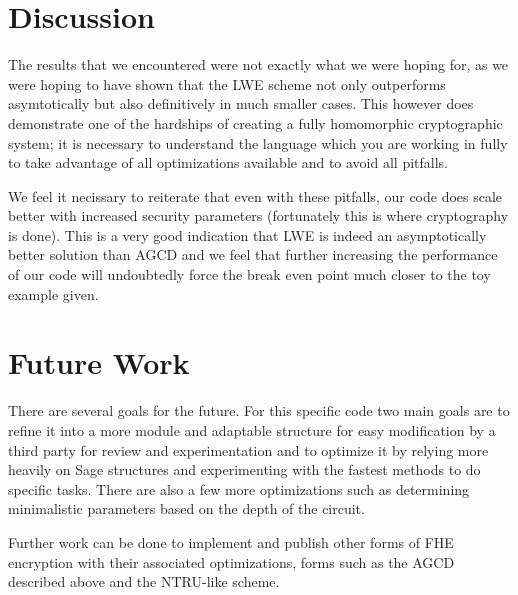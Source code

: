\documentclass[letterpaper,twocolumn,10pt]{article}
\begin{document}
\section{Discussion}
The results that we encountered were not exactly what we were hoping for, as we were hoping to have shown that the LWE scheme not only outperforms asymtotically but also definitively in much smaller cases. This however does demonstrate one of the hardships of creating a fully homomorphic cryptographic system; it is necessary to understand the language which you are working in fully to take advantage of all optimizations available and to avoid all pitfalls.

We feel it necissary to reiterate that even with these pitfalls, our code does scale better with increased security parameters (fortunately this is where cryptography is done). This is a very good indication that LWE is indeed an asymptotically better solution than AGCD and we feel that further increasing the performance of our code will undoubtedly force the break even point much closer to the toy example given.



\section{Future Work}
There are several goals for the future. For this specific code two main goals are to refine it into a more module and adaptable structure for easy modification by a third party for review and experimentation and to optimize it by relying more heavily on Sage structures and experimenting with the fastest methods to do specific tasks. There are also a few more optimizations such as determining minimalistic parameters based on the depth of the circuit. 

Further work can be done to implement and publish other forms of FHE encryption with their associated optimizations, forms such as the AGCD described above and the NTRU-like scheme.

\end{document}
